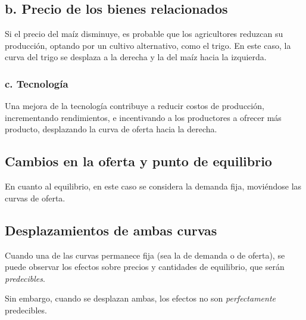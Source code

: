 \subsection{b. Precio de los bienes relacionados}

Si el precio del maíz disminuye,
es probable que los agricultores reduzcan su producción,
optando por un cultivo alternativo, como el trigo.
En este caso,
la curva del trigo se desplaza a la derecha y la del maíz hacia la izquierda.

\subsubsection{c. Tecnología}

Una mejora de la tecnología contribuye a reducir costos de producción,
incrementando rendimientos,
e incentivando a los productores a ofrecer más producto,
desplazando la curva de oferta hacia la derecha.

\subsection{Cambios en la oferta y punto de equilibrio}

En cuanto al equilibrio,
en este caso se considera la demanda fija,
moviéndose las curvas de oferta.

\subsection{Desplazamientos de ambas curvas}

Cuando una de las curvas permanece fija
(sea la de demanda o de oferta),
se puede observar los efectos sobre precios y cantidades de equilibrio,
que serán \textit{predecibles}.

Sin embargo,
cuando se desplazan ambas,
los efectos no son \textit{perfectamente} predecibles.
